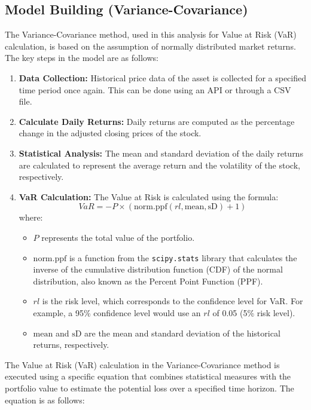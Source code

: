 \documentclass{article}
\begin{document}
\subsection{Model Building (Variance-Covariance)}

The Variance-Covariance method, used in this analysis for Value at Risk (VaR) calculation, is based on the assumption of normally distributed market returns. The key steps in the model are as follows:

\begin{enumerate}
    \item \textbf{Data Collection:} Historical price data of the asset is collected for a specified time period once again. This can be done using an API or through a CSV file.
    \item \textbf{Calculate Daily Returns:} Daily returns are computed as the percentage change in the adjusted closing prices of the stock.
    \item \textbf{Statistical Analysis:} The mean and standard deviation of the daily returns are calculated to represent the average return and the volatility of the stock, respectively.
    \item \textbf{VaR Calculation:} The Value at Risk is calculated using the formula:
    \begin{equation}
      VaR = - P \times (\text{norm.ppf}(rl, \text{mean}, \text{sD}) + 1) 
    \end{equation}
    where:
\begin{itemize}
    \item \( P \) represents the total value of the portfolio.
    \item \( \text{norm.ppf} \) is a function from the \texttt{scipy.stats} library that calculates the inverse of the cumulative distribution function (CDF) of the normal distribution, also known as the Percent Point Function (PPF).
    \item \( rl \) is the risk level, which corresponds to the confidence level for VaR. For example, a 95\% confidence level would use an \( rl \) of 0.05 (5\% risk level).
    \item \( \text{mean} \) and \( \text{sD} \) are the mean and standard deviation of the historical returns, respectively.
\end{itemize}
\end{enumerate}

The Value at Risk (VaR) calculation in the Variance-Covariance method is executed using a specific equation that combines statistical measures with the portfolio value to estimate the potential loss over a specified time horizon. The equation is as follows:
\end{document}
